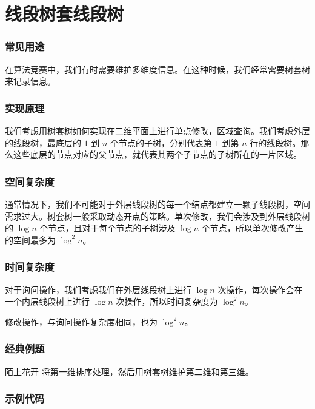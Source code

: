 
\section{线段树套线段树}

\subsubsection{常见用途}

在算法竞赛中，我们有时需要维护多维度信息。在这种时候，我们经常需要树套树来记录信息。

\subsubsection{实现原理}

我们考虑用树套树如何实现在二维平面上进行单点修改，区域查询。我们考虑外层的线段树，最底层的 $1$ 到 $n$ 个节点的子树，分别代表第 $1$ 到第 $n$ 行的线段树。那么这些底层的节点对应的父节点，就代表其两个子节点的子树所在的一片区域。

\subsubsection{空间复杂度}

通常情况下，我们不可能对于外层线段树的每一个结点都建立一颗子线段树，空间需求过大。树套树一般采取动态开点的策略。单次修改，我们会涉及到外层线段树的 $\log{n}$ 个节点，且对于每个节点的子树涉及 $\log{n}$ 个节点，所以单次修改产生的空间最多为 $\log^2{n}$。

\subsubsection{时间复杂度}

对于询问操作，我们考虑我们在外层线段树上进行 $\log{n}$ 次操作，每次操作会在一个内层线段树上进行 $\log{n}$ 次操作，所以时间复杂度为 $\log^2{n}$。

修改操作，与询问操作复杂度相同，也为 $\log^2{n}$。

\subsubsection{经典例题}

\href{https://www.lydsy.com/JudgeOnline/problem.php?id=3262}{陌上花开} 将第一维排序处理，然后用树套树维护第二维和第三维。

\subsubsection{示例代码}

